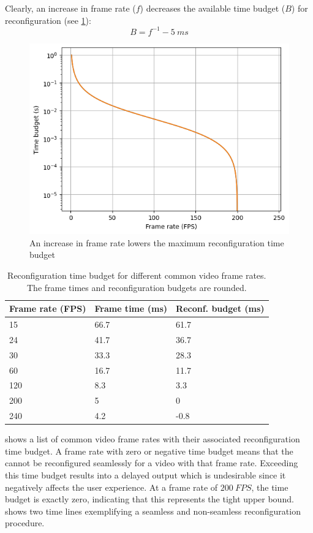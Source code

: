 Clearly, an increase in frame rate ($f$) decreases the available time budget ($B$) for reconfiguration (see \cref{fig:fps_vs_budget}):
\begin{equation}
    B = f^{-1} - \SI{5}{ms}
\end{equation}

\begin{figure}[htbp]
    \centering
    \includegraphics[width=0.5\linewidth]{assets/fps_vs_budget.png}
    \caption{An increase in frame rate lowers the maximum reconfiguration time budget}
    \label{fig:fps_vs_budget}
\end{figure}

\begin{table}[htbp]
\centering
\begin{tabular}{@{}lll@{}}
\toprule
Frame rate (FPS) & Frame time (ms) & Reconf. budget (ms) \\ \midrule
15               & 66.7            & 61.7                \\
24               & 41.7            & 36.7                \\
30               & 33.3            & 28.3                \\
60               & 16.7            & 11.7                \\
120              & 8.3             & 3.3                 \\
200              & 5               & 0                   \\
240              & 4.2             & -0.8                \\ \bottomrule
\end{tabular}
\caption{Reconfiguration time budget for different common video frame rates. The frame times and reconfiguration budgets are rounded.}
\label{tab:common_fps}
\end{table}

 shows a list of common video frame rates with their associated reconfiguration time budget.
A frame rate with zero or negative time budget means that the \graicore{} cannot be reconfigured seamlessly for a video with that frame rate.
Exceeding this time budget results into a delayed output which is undesirable since it negatively affects the user experience.
At a frame rate of $\SI{200}{FPS}$, the time budget is exactly zero, indicating that this represents the tight upper bound.
 shows two time lines exemplifying a seamless and non-seamless reconfiguration procedure.

